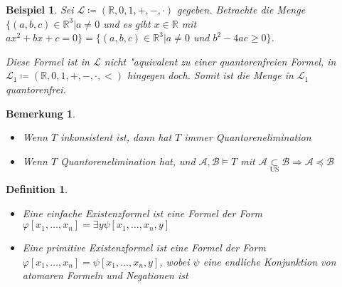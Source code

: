 \documentclass[a4paper,12pt,numbers=noenddot,parskip=full]{scrartcl}
\newcommand{\setR}{\mathbb{R}}
\newcommand{\scrL}{\mathcal{L}}
\newcommand{\scrA}{\mathcal{A}}
\newcommand{\scrB}{\mathcal{B}}
\theoremstyle{dotless}
\newtheorem{definition}[theorem]{Definition}
\newtheorem{example}[theorem]{Beispiel}
\newtheorem{remark}[theorem]{Bemerkung}
\begin{document}
\begin{example}
	Sei $\scrL \coloneqq (\setR, 0, 1, +, -, \cdot)$ gegeben. Betrachte die Menge $\{(a,b,c) \in \setR^3 | a \neq 0$ und es gibt $x \in \setR$ mit $ax^2+bx+c=0\} = \{(a,b,c) \in \setR^3 | a \neq 0$ und $b^2-4ac \geq 0\}$.
	
	Diese Formel ist in $\scrL$ nicht "aquivalent zu einer quantorenfreien Formel, in ${\scrL_1 \coloneqq (\setR, 0, 1, +, -, \cdot, <)}$ hingegen doch. Somit ist die Menge in $\scrL_1$ quantorenfrei.
\end{example}

\begin{remark}
	\begin{itemize}
		\item Wenn $T$ inkonsistent ist, dann hat $T$ immer Quantorenelimination
		\item Wenn $T$ Quantorenelimination hat, und $\scrA , \scrB \models T$ mit $\scrA \underset{\text{US}}{\subset} \scrB \Rightarrow \scrA \preceq \scrB$ 
	\end{itemize}
\end{remark}

\begin{definition}
	\begin{itemize}
		\item Eine einfache Existenzformel ist eine Formel der Form $\varphi[x_1, \dots, x_n]=\exists y \psi[x_1, \dots, x_n, y]$
		\item Eine primitive Existenzformel ist eine Formel der Form $\varphi[x_1, \dots, x_n]=\psi[x_1, \dots, x_n,y]$, wobei $\psi$ eine endliche Konjunktion von atomaren Formeln und Negationen ist
	\end{itemize}
\end{definition}
\end{document}
